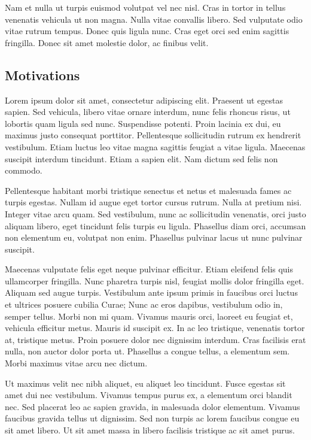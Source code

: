\documentclass[runningheads,a4paper]{llncs}
\begin{document}
Nam et nulla ut turpis euismod volutpat vel nec nisl. Cras in tortor in tellus venenatis vehicula ut non magna. Nulla vitae convallis libero. Sed vulputate odio vitae rutrum tempus. Donec quis ligula nunc. Cras eget orci sed enim sagittis fringilla. Donec sit amet molestie dolor, ac finibus velit. 
%
\newpage
%
\subsection{Motivations}
Lorem ipsum dolor sit amet, consectetur adipiscing elit. Praesent ut egestas sapien. Sed vehicula, libero vitae ornare interdum, nunc felis rhoncus risus, ut lobortis quam ligula sed nunc. Suspendisse potenti. Proin lacinia ex dui, eu maximus justo consequat porttitor. Pellentesque sollicitudin rutrum ex hendrerit vestibulum. Etiam luctus leo vitae magna sagittis feugiat a vitae ligula. Maecenas suscipit interdum tincidunt. Etiam a sapien elit. Nam dictum sed felis non commodo.

Pellentesque habitant morbi tristique senectus et netus et malesuada fames ac turpis egestas. Nullam id augue eget tortor cursus rutrum. Nulla at pretium nisi. Integer vitae arcu quam. Sed vestibulum, nunc ac sollicitudin venenatis, orci justo aliquam libero, eget tincidunt felis turpis eu ligula. Phasellus diam orci, accumsan non elementum eu, volutpat non enim. Phasellus pulvinar lacus ut nunc pulvinar suscipit.

Maecenas vulputate felis eget neque pulvinar efficitur. Etiam eleifend felis quis ullamcorper fringilla. Nunc pharetra turpis nisl, feugiat mollis dolor fringilla eget. Aliquam sed augue turpis. Vestibulum ante ipsum primis in faucibus orci luctus et ultrices posuere cubilia Curae; Nunc ac eros dapibus, vestibulum odio in, semper tellus. Morbi non mi quam. Vivamus mauris orci, laoreet eu feugiat et, vehicula efficitur metus. Mauris id suscipit ex. In ac leo tristique, venenatis tortor at, tristique metus. Proin posuere dolor nec dignissim interdum. Cras facilisis erat nulla, non auctor dolor porta ut. Phasellus a congue tellus, a elementum sem. Morbi maximus vitae arcu nec dictum.

Ut maximus velit nec nibh aliquet, eu aliquet leo tincidunt. Fusce egestas sit amet dui nec vestibulum. Vivamus tempus purus ex, a elementum orci blandit nec. Sed placerat leo ac sapien gravida, in malesuada dolor elementum. Vivamus faucibus gravida tellus ut dignissim. Sed non turpis ac lorem faucibus congue eu sit amet libero. Ut sit amet massa in libero facilisis tristique ac sit amet purus.
\end{document}
